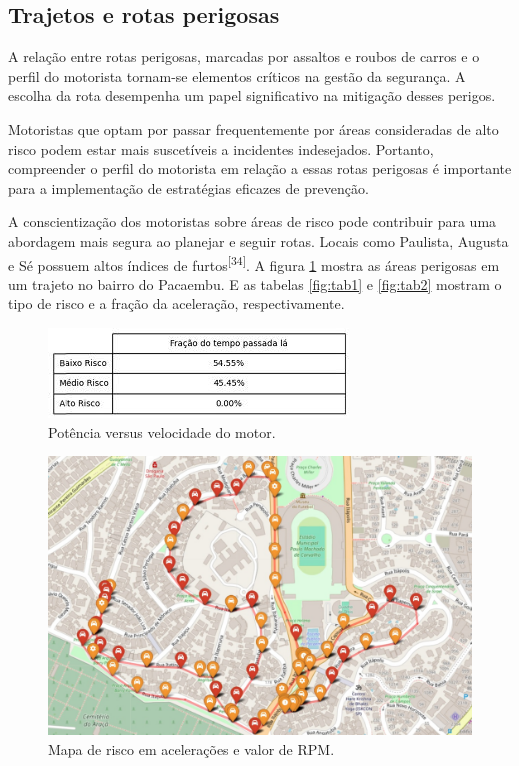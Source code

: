 \subsection{Trajetos e rotas perigosas}

A relação entre rotas perigosas, marcadas por assaltos e roubos de carros e o perfil do motorista tornam-se elementos críticos na gestão da segurança. A escolha da rota desempenha um papel significativo na mitigação desses perigos. 

Motoristas que optam por passar frequentemente por áreas consideradas de alto risco podem estar mais suscetíveis a incidentes indesejados. Portanto, compreender o perfil do motorista em relação a essas rotas perigosas é importante para a implementação de estratégias eficazes de prevenção. 

A conscientização dos motoristas sobre áreas de risco pode contribuir para uma abordagem mais segura ao planejar e seguir rotas.
Locais como Paulista, Augusta e Sé possuem altos índices de furtos\textsuperscript{[34]}. A figura \ref{fig:mapa_risco_acc_rpm} mostra as áreas perigosas em um trajeto no bairro do Pacaembu. E as tabelas \ref{fig:tab1} e \ref{fig:tab2} mostram o tipo de risco e a fração da aceleração, respectivamente.

\begin{figure}[hp]
    \centering
    
    \includegraphics[scale= 1]{figures/tabela_fracao1.jpg}
    
    \caption{Potência versus velocidade do motor.}
    
    
\end{figure}

\begin{figure}[hp]
    \centering
    
    \includegraphics[scale=0.15]{figures/mapa_risco_acc_rpm.jpeg}
    
    \caption{Mapa de risco em acelerações e valor de RPM.}
    
    \label{fig:mapa_risco_acc_rpm}
\end{figure}


